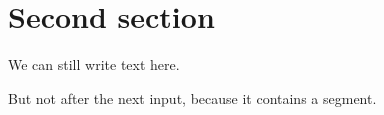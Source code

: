 \section{Second section}



We can still write text here.

But not after the next input, because it contains a segment.


